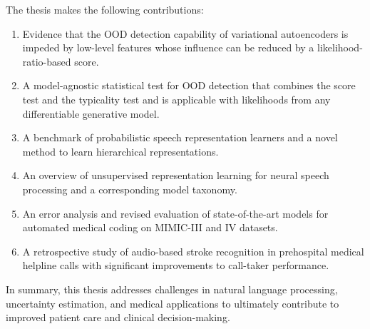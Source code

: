 
The thesis makes the following contributions:
%
\begin{enumerate}[label=(\roman*), topsep=3pt, partopsep=0pt, itemsep=1pt, parsep=0pt] 
    \item Evidence that the OOD detection capability of variational autoencoders is impeded by low-level features whose influence can be reduced by a likelihood-ratio-based score.
    \item A model-agnostic statistical test for OOD detection that combines the score test and the typicality test and is applicable with likelihoods from any differentiable generative model.
    \item A benchmark of probabilistic speech representation learners and a novel method to learn hierarchical representations.
    \item An overview of unsupervised representation learning for neural speech processing and a corresponding model taxonomy.
    \item An error analysis and revised evaluation of state-of-the-art models for automated medical coding on MIMIC-III and IV datasets. 
    \item A retrospective study of audio-based stroke recognition in prehospital medical helpline calls with significant improvements to call-taker performance.
\end{enumerate}
%
In summary, this thesis addresses challenges in natural language processing, uncertainty estimation, and medical applications to ultimately contribute to improved patient care and clinical decision-making.




